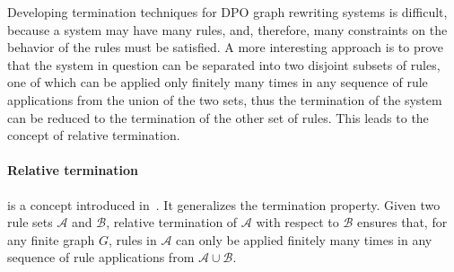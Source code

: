 Developing termination techniques for DPO graph rewriting systems is difficult, because a system may have many rules, and, therefore, many constraints on the behavior of the rules must be satisfied. A more interesting approach is to prove that the system in question can be separated into two disjoint subsets of rules, one of which can be applied only finitely many times in any sequence of rule applications from the union of the two sets, thus the termination of the system can be reduced to the termination of the other set of rules. This leads to the concept of relative termination.

\paragraph{Relative termination} is a concept introduced in~\cite{klop1987term,geser1990relative}. It generalizes the termination property.
 Given two rule sets \( \mathcal{A} \) and \( \mathcal{B} \), relative termination of \( \mathcal{A} \) with respect to \( \mathcal{B} \) ensures that, for any finite graph $G$,
rules in $\mathcal{A}$ can only be applied finitely many times in any sequence of rule applications from $\mathcal{A} \cup \mathcal{B}$.
  
